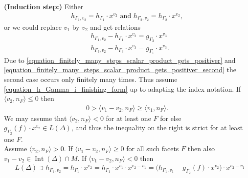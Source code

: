 \documentclass[12pt, english]{article}
\DeclareMathOperator{\Int}{Int}
\begin{document}
{\bfseries (Induction step:)} Either 
\begin{align} \label{equation_h_Gamma_i_finishing_form}
	h_{\Gamma_1,v_2} = h_{\Gamma_1} \cdot x^{v_2} \textrm{ and } h_{\Gamma_2,v_2} = h_{\Gamma_2} \cdot x^{v_2},
\end{align}
or we could replace $v_1$ by $v_2$ and get relations 
\begin{align*}
	& h_{\Gamma_1,v_2} - h_{\Gamma_1} \cdot x^{v_2} = g_{\Gamma_3} \cdot x^{v_3} \\
	& h_{\Gamma_3,v_2} - h_{\Gamma_3} \cdot x^{v_3} = g_{\Gamma_1} \cdot x^{v_3}.
\end{align*}
Due to \ref{equation_finitely_many_steps_scalar_product_gets_positiver} and \ref{equation_finitely_many_steps_scalar_product_gets_positiver_second} the second case occurs only finitely many times. Thus assume \ref{equation_h_Gamma_i_finishing_form} up to adapting the index notation. If $\langle v_2,n_F \rangle \leq 0$ then
\begin{align*}
	0 > \langle v_1 - v_2, n_F \rangle \geq \langle v_1,n_F \rangle.
\end{align*}
We may assume that $\langle v_2,n_F \rangle < 0$ for at least one $F$ for else $g_{\Gamma_2}(f) \cdot x^{v_2} \in L(\Delta)$, and thus the inequality on the right is strict for at least one $F$. \\
Assume $\langle v_2,n_F \rangle > 0$. If $\langle v_1 - v_2, n_F \rangle \geq 0$ for all such facets $F$ then also $v_1-v_2 \in \Int(\Delta) \cap M$. If $\langle v_1-v_2,n_F \rangle < 0$ then 
\begin{align*}
	& L(\Delta) \ni h_{\Gamma_1,v_2} = h_{\Gamma_1} \cdot x^{v_2} = h_{\Gamma_1} \cdot x^{v_1} \cdot x^{v_2-v_1} = \big( h_{\Gamma_1,v_1} - g_{\Gamma_2}(f) \cdot x^{v_2} \big) \cdot x^{v_2-v_1} 
\end{align*}
\end{document}
